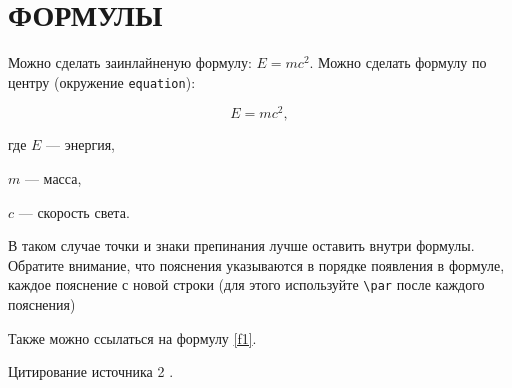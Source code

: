 \section{ФОРМУЛЫ}

Можно сделать заинлайненую формулу: $E = mc^2$. Можно сделать формулу по центру (окружение \texttt{equation}):

\begin{equation}
    \label{f1}
    E = mc^2,
\end{equation}

где $E$ --- энергия,\par $m$ --- масса,\par $c$ --- скорость света.

В таком случае точки и знаки препинания лучше оставить внутри формулы. Обратите внимание, что пояснения указываются в порядке появления в формуле, каждое пояснение с новой строки (для этого используйте \texttt{\textbackslash par} после каждого пояснения)

Также можно ссылаться на формулу \ref{f1}.

\lipsum[3]

Цитирование источника 2 \cite{cite_1_1}.
